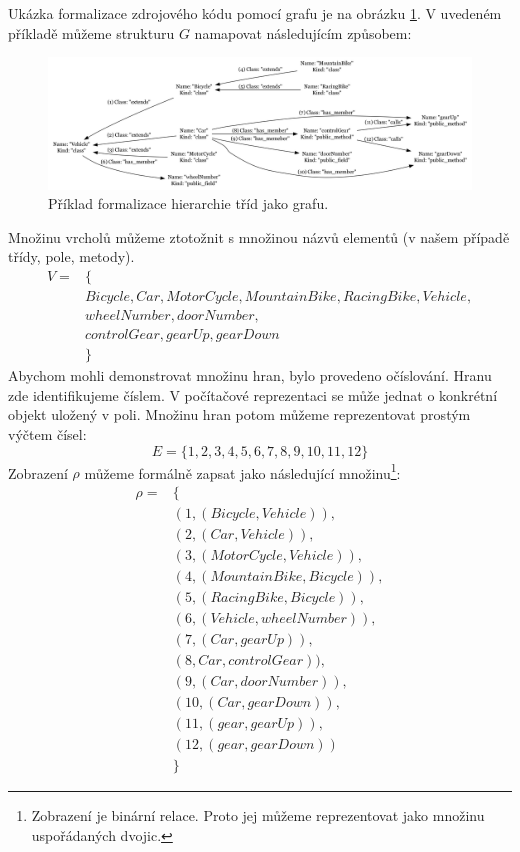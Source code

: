 Ukázka formalizace zdrojového kódu pomocí grafu je na obrázku \ref{design-graph_example}. V uvedeném příkladě můžeme strukturu $G$ namapovat následujícím způsobem:
\begin{figure}[h!]
  \centering
  \includegraphics[width=1.0\textwidth]{./graphs/graph_example.png}
  \caption{Příklad formalizace hierarchie tříd jako grafu.\label{design-graph_example}}
\end{figure}
Množinu vrcholů můžeme ztotožnit s množinou názvů elementů (v našem případě třídy, pole, metody).
\begin{align*}
V = &\{ \\
&Bicycle, Car, MotorCycle, MountainBike, RacingBike, Vehicle, \\
&wheelNumber, doorNumber, \\
&controlGear, gearUp, gearDown \\
&\}
\end{align*}
Abychom mohli demonstrovat množinu hran, bylo provedeno očíslování. Hranu zde identifikujeme číslem. V počítačové reprezentaci se může jednat o konkrétní objekt uložený v poli. Množinu hran potom můžeme reprezentovat prostým výčtem čísel:
\begin{displaymath}
E = \{1, 2, 3, 4, 5, 6, 7, 8, 9, 10, 11, 12\}
\end{displaymath}
Zobrazení $\rho$ můžeme formálně zapsat jako následující množinu\footnote{Zobrazení je binární relace. Proto jej můžeme reprezentovat jako množinu uspořádaných dvojic.}:
\begin{align*}
\rho = &\{ \\
&(1, (Bicycle, Vehicle)), \\
&(2, (Car, Vehicle)), \\
&(3, (MotorCycle, Vehicle)), \\
&(4, (MountainBike, Bicycle)), \\
&(5, (RacingBike, Bicycle)), \\
&(6, (Vehicle, wheelNumber)), \\
&(7, (Car, gearUp)), \\
&(8, Car, controlGear)), \\
&(9, (Car, doorNumber)), \\
&(10, (Car, gearDown)), \\
&(11, (gear, gearUp)), \\
&(12, (gear, gearDown)) \\
&\}
\end{align*}
